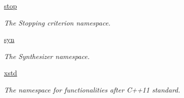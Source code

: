 \begin{DoxyCompactItemize}
 \hyperlink{namespacegko_1_1stop}{stop}
\begin{DoxyCompactList}\small\item\em The Stopping criterion namespace. \end{DoxyCompactList}\item 
 \hyperlink{namespacegko_1_1syn}{syn}
\begin{DoxyCompactList}\small\item\em The Synthesizer namespace. \end{DoxyCompactList}\item 
 \hyperlink{namespacegko_1_1xstd}{xstd}
\begin{DoxyCompactList}\small\item\em The namespace for functionalities after C++11 standard. \end{DoxyCompactList}\end{DoxyCompactItemize}
